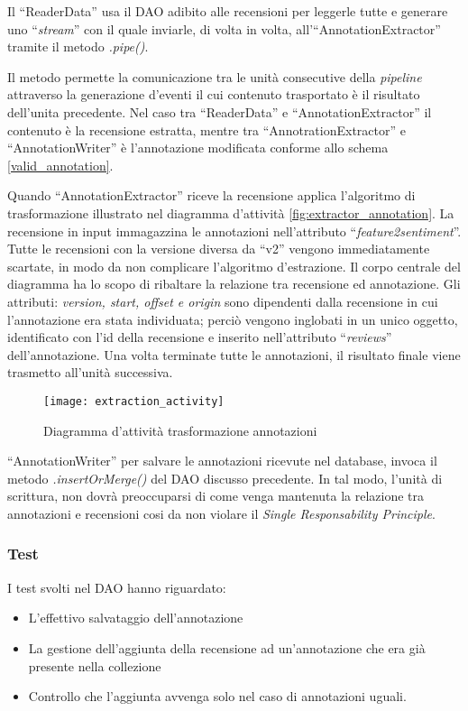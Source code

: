 Il ``ReaderData'' usa il \gls{DAO} adibito alle recensioni per leggerle tutte
e generare uno ``\textit{stream}'' con il quale inviarle, di volta in volta,
all'``AnnotationExtractor'' tramite il metodo \textit{.pipe()}.

Il metodo permette la comunicazione tra le unità consecutive della
\textit{pipeline} attraverso la generazione d'eventi il cui contenuto
trasportato è il risultato dell'unita precedente. Nel caso tra ``ReaderData'' e
``AnnotationExtractor'' il contenuto è la recensione estratta, mentre tra
``AnnotrationExtractor'' e ``AnnotationWriter'' è l'annotazione modificata
conforme allo schema \ref{valid_annotation}.

Quando ``AnnotationExtractor'' riceve la recensione applica l'algoritmo di
trasformazione illustrato nel diagramma d'attività
\ref{fig:extractor_annotation}. La recensione in input immagazzina le
annotazioni nell'attributo ``\textit{feature2sentiment}''. Tutte le recensioni
con la versione diversa da ``v2'' vengono immediatamente scartate, in modo da
non complicare l'algoritmo d'estrazione. Il corpo centrale del diagramma ha lo
scopo di ribaltare la relazione tra recensione ed annotazione. Gli attributi:
\textit{version, start, offset e origin} sono dipendenti dalla recensione in
cui l'annotazione era stata individuata; perciò vengono inglobati in un unico
oggetto, identificato con l'id della recensione e inserito nell'attributo
``\textit{reviews}'' dell'annotazione. Una volta terminate tutte le annotazioni,
il risultato finale viene trasmetto all'unità successiva.

\begin{figure}[H]
\begin{center}
\texttt{[image: extraction\_activity]}
\caption{
Diagramma d'attività trasformazione annotazioni
}
\label{fig:extraction_activity}
\end{center}
\end{figure}

``AnnotationWriter'' per salvare le annotazioni ricevute nel database, invoca il
metodo \textit{.insertOrMerge()} del \gls{DAO} discusso precedente. In tal modo,
l'unità di scrittura, non dovrà preoccuparsi di come venga mantenuta
la relazione tra annotazioni e recensioni cosi da non violare il
\textit{Single Responsability Principle}.

\subsubsection{Test}
I test svolti nel \gls{DAO} hanno riguardato:
\begin{itemize}
\item L'effettivo salvataggio dell'annotazione
\item La gestione dell'aggiunta della recensione ad un'annotazione che era già
presente nella collezione
\item Controllo che l'aggiunta avvenga solo nel caso di annotazioni uguali.
\end{itemize}

